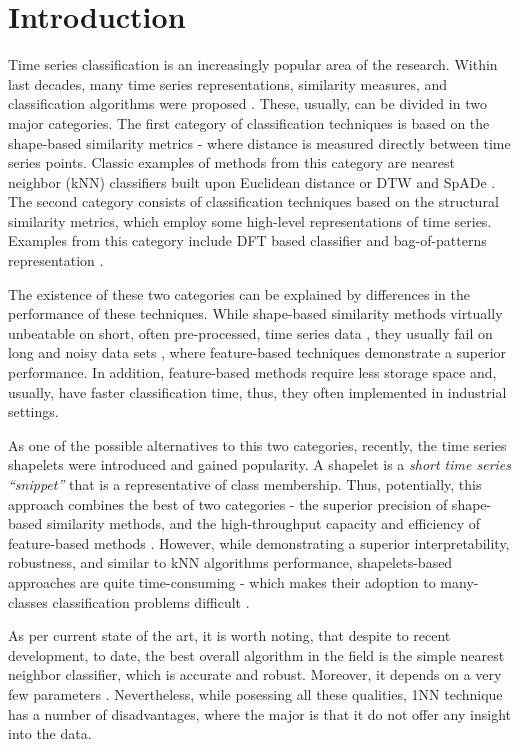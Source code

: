 \documentclass{llncs}
\begin{document}
\section{Introduction}
%
Time series classification is an increasingly popular area of the research. 
Within last decades, many time series representations, similarity measures, 
and classification algorithms were proposed \cite{review}. 
These, usually, can be divided in two major categories. 
The first category of classification techniques is based on the shape-based 
similarity metrics - where distance is measured directly between time series points. 
Classic examples of methods from this category are nearest neighbor (kNN)
classifiers built upon Euclidean distance or DTW \cite{1NN} and SpADe \cite{spade}. 
The second category consists of classification techniques based on the 
structural similarity metrics, which employ some high-level representations 
of time series. Examples from this category include DFT based classifier \cite{DFT}
and bag-of-patterns representation \cite{bag_patterns}. 

The existence of these two categories can be explained by differences in the 
performance of these techniques. 
While shape-based similarity methods virtually unbeatable on short, often pre-processed,
time series data \cite{benchmark}, 
they usually fail on long and noisy data sets \cite{indexing},
where feature-based techniques demonstrate a superior performance. 
In addition, feature-based methods require less storage space and, usually, 
have faster classification time, thus, they often implemented in industrial settings. 

As one of the possible alternatives to this two categories, recently, the time series shapelets
were introduced \cite{shapelet} and gained popularity. A shapelet is a \textit{short time series 
``snippet''} that is a representative of class membership. Thus, potentially, this approach combines
the best of two categories - the superior precision of shape-based similarity methods, and the
high-throughput capacity and efficiency of feature-based methods \cite{logical}. However, while
demonstrating a superior interpretability, robustness, and similar to kNN algorithms performance,
shapelets-based approaches are quite time-consuming - which makes their adoption to many-classes
classification problems difficult \cite{bagnal}. 

As per current state of the art, it is worth noting, that despite to recent development, to date, the
best overall algorithm in the field is the simple nearest neighbor classifier, which is accurate
and robust. Moreover, it depends on a very few parameters \cite{benchmark} \cite{comparison}
\cite{classifiers}. Nevertheless, while posessing all these qualities, 1NN
technique has a number of disadvantages, where the major is that it do not offer any 
insight into the data.
\end{document}
